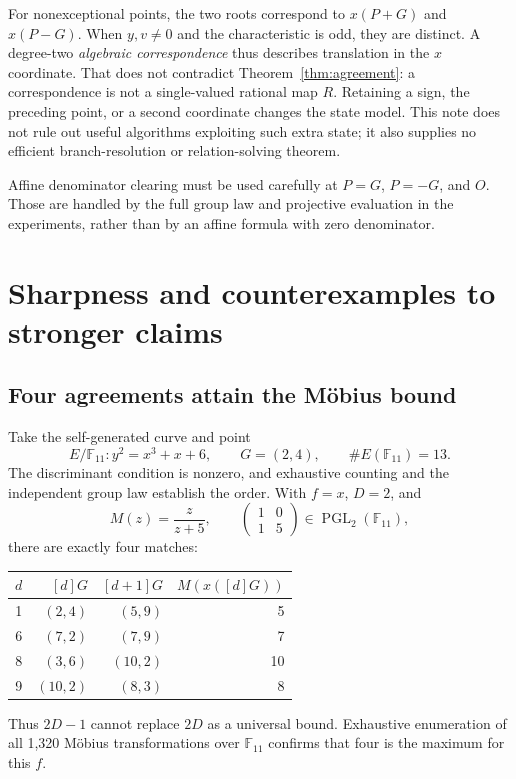 \documentclass[11pt,letterpaper]{article}
\theoremstyle{definition}
\theoremstyle{remark}
\newcommand{\F}{\mathbb F}
\newcommand{\PGL}{\operatorname{PGL}}
\begin{document}
For nonexceptional points, the two roots correspond to $x(P+G)$ and $x(P-G)$. When $y,v\ne0$ and the characteristic is odd, they are distinct. A degree-two \emph{algebraic correspondence} thus describes translation in the $x$ coordinate. That does not contradict Theorem~\ref{thm:agreement}: a correspondence is not a single-valued rational map $R$. Retaining a sign, the preceding point, or a second coordinate changes the state model. This note does not rule out useful algorithms exploiting such extra state; it also supplies no efficient branch-resolution or relation-solving theorem.

Affine denominator clearing must be used carefully at $P=G$, $P=-G$, and $O$. Those are handled by the full group law and projective evaluation in the experiments, rather than by an affine formula with zero denominator.

\section{Sharpness and counterexamples to stronger claims}\label{sec:counter}

\subsection{Four agreements attain the M\"obius bound}

Take the self-generated curve and point
\[
E/\F_{11}:y^2=x^3+x+6,\qquad G=(2,4),\qquad\#E(\F_{11})=13.
\]
The discriminant condition is nonzero, and exhaustive counting and the independent group law establish the order. With $f=x$, $D=2$, and
\[
M(z)=\frac{z}{z+5},\qquad
\begin{pmatrix}1&0\\1&5\end{pmatrix}\in\PGL_2(\F_{11}),
\]
there are exactly four matches:
\begin{center}
\begin{tabular}{rrrr}
\toprule
$d$ & $[d]G$ & $[d+1]G$ & $M(x([d]G))$\\
\midrule
1 & $(2,4)$ & $(5,9)$ & 5\\
6 & $(7,2)$ & $(7,9)$ & 7\\
8 & $(3,6)$ & $(10,2)$ & 10\\
9 & $(10,2)$ & $(8,3)$ & 8\\
\bottomrule
\end{tabular}
\end{center}
Thus $2D-1$ cannot replace $2D$ as a universal bound. Exhaustive enumeration of all 1,320 M\"obius transformations over $\F_{11}$ confirms that four is the maximum for this $f$.
\end{document}
